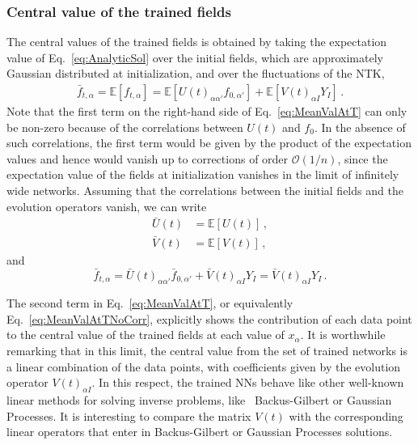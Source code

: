 \subsubsection{Central value of the trained fields}
\label{sec:CentralValue}
The central values of the trained fields is obtained by taking the expectation value of
Eq.~\eqref{eq:AnalyticSol} over the initial fields, which are approximately Gaussian distributed at 
initialization, and over the fluctuations of the NTK,
\begin{align}
    \label{eq:MeanValAtT}
    \bar{f}_{t,\alpha} = \mathbb{E}\left[f_{t,\alpha}\right]
        = \mathbb{E}\left[U(t)_{\alpha\alpha'} f_{0,\alpha'}\right]
            + \mathbb{E}\left[V(t)_{\alpha I} Y_I\right] \, .
\end{align}
Note that the first term on the right-hand side of Eq.~\eqref{eq:MeanValAtT} can only be non-zero because of the
correlations between $U(t)$ and $f_0$. In the absence of such correlations, the first term would be given by the product
of the expectation values and hence would vanish up to corrections of order $\mathcal{O}(1/n)$, since the expectation
value of the fields at initialization vanishes in the limit of infinitely wide networks.
Assuming that the correlations between the initial fields and the evolution operators vanish, we can write
\begin{align}
    \label{eq:MeanUt}
    \bar{U}(t)
        &= \mathbb{E}\left[U(t)\right]\, , \\
    \label{eq:MeanVt}
    \bar{V}(t)
        &= \mathbb{E}\left[V(t)\right]\, ,
\end{align}
and
\begin{equation}
    \label{eq:MeanValAtTNoCorr}
    \bar{f}_{t,\alpha} = \bar{U}(t)_{\alpha\alpha'} \bar{f}_{0,\alpha'}
        + \bar{V}(t)_{\alpha I} Y_I = \bar{V}(t)_{\alpha I} Y_I \, .
\end{equation}

The second term in Eq.~\eqref{eq:MeanValAtT}, or equivalently Eq.~\eqref{eq:MeanValAtTNoCorr}, explicitly shows the contribution
of each data point to the central value of the
trained fields at each value of $x_{\alpha}$. It is worthwhile remarking that in this limit, the central value
from the set of trained networks is a linear combination of the data points, with coefficients given by the
evolution operator $V(t)_{\alpha I}$. In this respect, the trained NNs behave like other well-known linear methods for 
solving inverse problems, like \eg\ Backus-Gilbert or Gaussian Processes. It is interesting to compare the matrix $V(t)$ with 
the corresponding linear operators that enter in Backus-Gilbert or Gaussian Processes solutions. 

